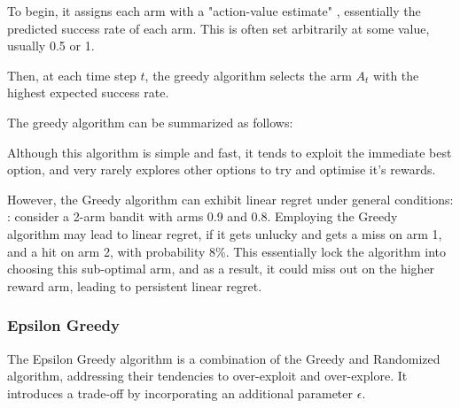 To begin, it assigns each arm with a "action-value estimate" \actionValueEstimate, essentially the predicted success rate of each arm. This is often set arbitrarily at some value, usually 0.5 or 1.

Then, at each time step $t$, the greedy algorithm selects the arm $A_t$ with the highest expected success rate.

The greedy algorithm can be summarized as follows:


Although this algorithm is simple and fast, it tends to exploit the immediate best option, and very rarely explores other options to try and optimise it's rewards.

However, the Greedy algorithm can exhibit linear regret under general conditions: : consider a 2-arm bandit with arms 0.9 and 0.8. Employing the Greedy algorithm may lead to linear regret, if it gets unlucky and gets a miss on arm 1, and a hit on arm 2, with probability 8\%. This essentially lock the algorithm into choosing this sub-optimal arm, and as a result, it could miss out on the higher reward arm, leading to persistent linear regret.

\subsubsection{Epsilon Greedy}
\label{sec:EpsilonGreedy}
The Epsilon Greedy algorithm is a combination of the Greedy and Randomized algorithm, addressing their tendencies to over-exploit and over-explore. It introduces a trade-off by incorporating an additional parameter $\epsilon$.

